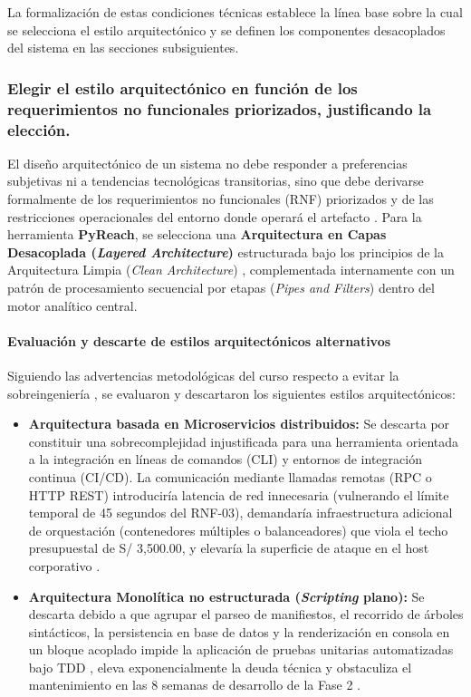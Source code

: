 La formalización de estas condiciones técnicas establece la línea base sobre la cual se selecciona el estilo arquitectónico y se definen los componentes desacoplados del sistema en las secciones subsiguientes.


\subsubsection{Elegir el estilo arquitectónico en función de los requerimientos no funcionales priorizados, justificando la elección.}

El diseño arquitectónico de un sistema no debe responder a preferencias subjetivas ni a tendencias tecnológicas transitorias, sino que debe derivarse formalmente de los requerimientos no funcionales (RNF) priorizados y de las restricciones operacionales del entorno donde operará el artefacto \cite{pressman2020software, martin2017cleanarch}. Para la herramienta \textbf{PyReach}, se selecciona una \textbf{Arquitectura en Capas Desacoplada (\textit{Layered Architecture})} estructurada bajo los principios de la Arquitectura Limpia (\textit{Clean Architecture}) \cite{martin2017cleanarch}, complementada internamente con un patrón de procesamiento secuencial por etapas (\textit{Pipes and Filters}) dentro del motor analítico central.

\paragraph*{Evaluación y descarte de estilos arquitectónicos alternativos}
Siguiendo las advertencias metodológicas del curso respecto a evitar la sobreingeniería \cite{torres2026proyecto}, se evaluaron y descartaron los siguientes estilos arquitectónicos:

\begin{itemize}
    \item \textbf{Arquitectura basada en Microservicios distribuidos:} Se descarta por constituir una sobrecomplejidad injustificada para una herramienta orientada a la integración en líneas de comandos (CLI) y entornos de integración continua (CI/CD). La comunicación mediante llamadas remotas (RPC o HTTP REST) introduciría latencia de red innecesaria (vulnerando el límite temporal de 45 segundos del RNF-03), demandaría infraestructura adicional de orquestación (contenedores múltiples o balanceadores) que viola el techo presupuestal de S/ 3,500.00, y elevaría la superficie de ataque en el host corporativo \cite{humble2010continuous, ladisa2023sok}.
    \item \textbf{Arquitectura Monolítica no estructurada (\textit{Scripting} plano):} Se descarta debido a que agrupar el parseo de manifiestos, el recorrido de árboles sintácticos, la persistencia en base de datos y la renderización en consola en un bloque acoplado impide la aplicación de pruebas unitarias automatizadas bajo TDD \cite{myers2011art}, eleva exponencialmente la deuda técnica y obstaculiza el mantenimiento en las 8 semanas de desarrollo de la Fase 2 \cite{fowler2018refactoring}.
\end{itemize}


